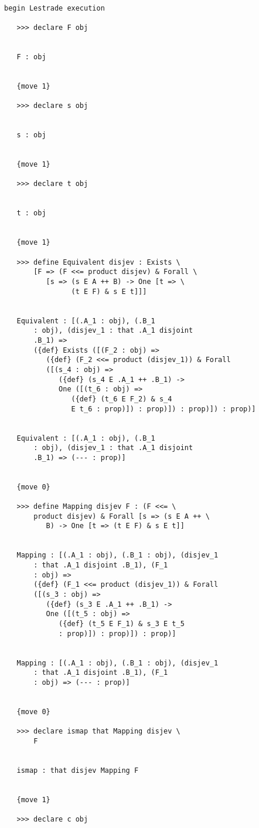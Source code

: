 \documentclass[12pt]{article}
\begin{document}
\begin{verbatim}

begin Lestrade execution

   >>> declare F obj


   F : obj


   {move 1}

   >>> declare s obj


   s : obj


   {move 1}

   >>> declare t obj


   t : obj


   {move 1}

   >>> define Equivalent disjev : Exists \
       [F => (F <<= product disjev) & Forall \
          [s => (s E A ++ B) -> One [t => \
                (t E F) & s E t]]]


   Equivalent : [(.A_1 : obj), (.B_1 
       : obj), (disjev_1 : that .A_1 disjoint 
       .B_1) => 
       ({def} Exists ([(F_2 : obj) => 
          ({def} (F_2 <<= product (disjev_1)) & Forall 
          ([(s_4 : obj) => 
             ({def} (s_4 E .A_1 ++ .B_1) -> 
             One ([(t_6 : obj) => 
                ({def} (t_6 E F_2) & s_4 
                E t_6 : prop)]) : prop)]) : prop)]) : prop)]


   Equivalent : [(.A_1 : obj), (.B_1 
       : obj), (disjev_1 : that .A_1 disjoint 
       .B_1) => (--- : prop)]


   {move 0}

   >>> define Mapping disjev F : (F <<= \
       product disjev) & Forall [s => (s E A ++ \
          B) -> One [t => (t E F) & s E t]]


   Mapping : [(.A_1 : obj), (.B_1 : obj), (disjev_1 
       : that .A_1 disjoint .B_1), (F_1 
       : obj) => 
       ({def} (F_1 <<= product (disjev_1)) & Forall 
       ([(s_3 : obj) => 
          ({def} (s_3 E .A_1 ++ .B_1) -> 
          One ([(t_5 : obj) => 
             ({def} (t_5 E F_1) & s_3 E t_5 
             : prop)]) : prop)]) : prop)]


   Mapping : [(.A_1 : obj), (.B_1 : obj), (disjev_1 
       : that .A_1 disjoint .B_1), (F_1 
       : obj) => (--- : prop)]


   {move 0}

   >>> declare ismap that Mapping disjev \
       F


   ismap : that disjev Mapping F


   {move 1}

   >>> declare c obj



\end{verbatim}
\end{document}
